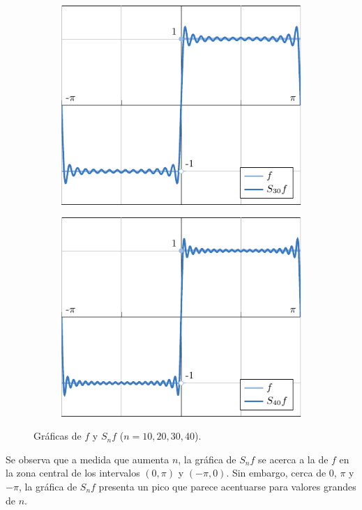 \documentclass[a4paper, 12pt, oneside]{book}
\begin{document}
\begin{figure}[H]
\begin{subfigure}[b]{0.49\textwidth}
    \includegraphics{./plot3/main.pdf}
\end{subfigure}
\begin{subfigure}[b]{0.49\textwidth}
    \centering
    \includegraphics{./plot4/main.pdf}
\end{subfigure}
\caption{Gráficas de $f$ y $S_nf$ ($n = 10,20,30,40$).}
\end{figure}

Se observa que a medida que aumenta $n$, la gráfica de $S_nf$ se acerca a la de $f$ en la zona central de los intervalos $(0,\pi)$ y $(-\pi,0)$. Sin embargo, cerca de $0$, $\pi$ y $-\pi$, la gráfica de $S_nf$ presenta un pico que parece acentuarse para valores grandes de $n$.
\end{document}
